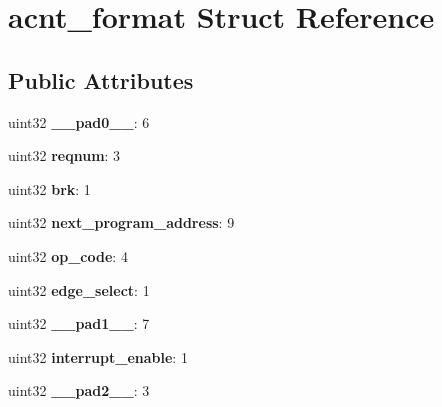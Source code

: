 \hypertarget{structacnt__format}{}\section{acnt\+\_\+format Struct Reference}
\label{structacnt__format}
\subsection*{Public Attributes}
\begin{DoxyCompactItemize}
\item 
\mbox{\label{structacnt__format_ab0a02140a0cc932c71a588a930942459}} 
uint32 {\bfseries \+\_\+\+\_\+pad0\+\_\+\+\_\+}\+: 6
\item 
\mbox{\label{structacnt__format_a66c77082711cbeebb17ad6b9d691eae4}} 
uint32 {\bfseries reqnum}\+: 3
\item 
\mbox{\label{structacnt__format_a05d08b891cbce13ee40ef3df162ebb70}} 
uint32 {\bfseries brk}\+: 1
\item 
\mbox{\label{structacnt__format_ab95f8ed305471265b20f3918a67c1a71}} 
uint32 {\bfseries next\+\_\+program\+\_\+address}\+: 9
\item 
\mbox{\label{structacnt__format_a6946a213410d30ad65630ee4ab32e128}} 
uint32 {\bfseries op\+\_\+code}\+: 4
\item 
\mbox{\label{structacnt__format_a7adef26d58d6667ba05d02c05de11f38}} 
uint32 {\bfseries edge\+\_\+select}\+: 1
\item 
\mbox{\label{structacnt__format_a39b03a1781ae1bbc11b1fe8164f7f45a}} 
uint32 {\bfseries \+\_\+\+\_\+pad1\+\_\+\+\_\+}\+: 7
\item 
\mbox{\label{structacnt__format_a2dfa5dcb7e8305e3dae08ec4e8d99d1e}} 
uint32 {\bfseries interrupt\+\_\+enable}\+: 1
\item 
\mbox{\label{structacnt__format_a4fcf1072af668815ddce6b336d48f810}} 
uint32 {\bfseries \+\_\+\+\_\+pad2\+\_\+\+\_\+}\+: 3

\end{DoxyCompactItemize}

